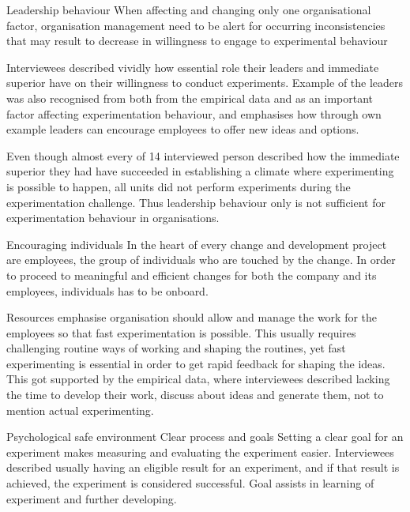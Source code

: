 Leadership behaviour \newline
When affecting and changing only one organisational factor, organisation management need to be alert for occurring inconsistencies that may result to decrease in willingness to engage to experimental behaviour \citep{lee2004mixed}

Interviewees described vividly how essential role their leaders and immediate superior have on their willingness to conduct experiments. 
Example of the leaders was also recognised from both from the empirical data and as an important factor affecting experimentation behaviour, and \citet{garvin2008yours} emphasises how through own example leaders can encourage employees to offer new ideas and options.

Even though almost every of 14 interviewed person described how the immediate superior they had have succeeded in establishing a climate where experimenting is possible to happen, all units did not perform experiments during the experimentation challenge. Thus leadership behaviour only is not sufficient for experimentation behaviour in organisations.

Encouraging individuals \newline
In the heart of every change and development project are employees, the group of individuals who are touched by the change. In order to proceed to meaningful and efficient changes for both the company and its employees, individuals has to be onboard. 

Resources \newline
\citet{thomke2001enlightened} emphasise organisation should allow and manage the work for the employees so that fast experimentation is possible. This usually requires challenging routine ways of working and shaping the routines, yet fast experimenting is essential in order to get rapid feedback for shaping the ideas. This got supported by the empirical data, where interviewees described lacking the time to develop their work, discuss about ideas and generate them, not to mention actual experimenting. 

Psychological safe environment
\newline
Clear process and goals\newline
Setting a clear goal for an experiment makes measuring and evaluating the experiment easier. Interviewees described usually having an eligible result for an experiment, and if that result is achieved, the experiment is considered successful. Goal assists in learning of experiment and further developing. 

